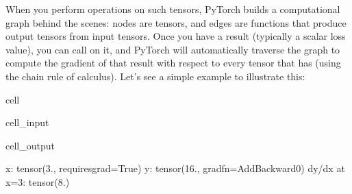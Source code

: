 \documentclass[letterpaper,10pt,english]{jupyterBook}
\begin{document}
\sphinxAtStartPar
When you perform operations on such tensors, PyTorch builds a computational graph behind the scenes: nodes are tensors, and edges are functions that produce output tensors from input tensors. Once you have a result (typically a scalar loss value), you can call  on it, and PyTorch will automatically traverse the graph to compute the gradient of that result with respect to every tensor that has  (using the chain rule of calculus). Let’s see a simple example to illustrate this:

\begin{sphinxuseclass}{cell}\begin{sphinxVerbatimInput}

\begin{sphinxuseclass}{cell_input}
\begin{sphinxVerbatim}[commandchars=\\\{\}]
      
 

      
 

    
 
\end{sphinxVerbatim}

\end{sphinxuseclass}\end{sphinxVerbatimInput}
\begin{sphinxVerbatimOutput}

\begin{sphinxuseclass}{cell_output}
\begin{sphinxVerbatim}[commandchars=\\\{\}]
x: tensor(3., requires\PYGZus{}grad=True)
y: tensor(16., grad\PYGZus{}fn=\PYGZlt{}AddBackward0\PYGZgt{})
dy/dx at x=3: tensor(8.)
\end{sphinxVerbatim}

\end{sphinxuseclass}\end{sphinxVerbatimOutput}

\end{sphinxuseclass}
\end{document}
